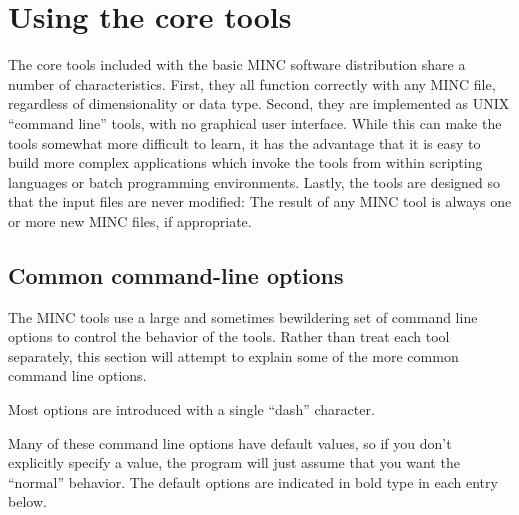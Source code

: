 \documentclass{article}
\begin{document}
\section{Using the core tools}
The core tools included with the basic MINC software distribution
share a number of characteristics.  First, they all function correctly
with any MINC file, regardless of dimensionality or data type.
Second, they are implemented as UNIX ``command line'' tools, with no
graphical user interface.  While this can make the tools somewhat more
difficult to learn, it has the advantage that it is easy to build more
complex applications which invoke the tools from within scripting
languages or batch programming environments.  Lastly, the tools are
designed so that the input files are never modified: The result of any
MINC tool is always one or more new MINC files, if appropriate.

\subsection{Common command-line options}
The MINC tools use a large and sometimes bewildering set of command line
options to control the behavior of the tools.  Rather than treat
each tool separately, this section will attempt to explain some of the 
more common command line options.

Most options are introduced with a single ``dash'' character.

Many of these command line options have default values, so if you 
don't explicitly specify a value, the program will just assume that
you want the ``normal'' behavior.  The default options are indicated
in bold type in each entry below.
\end{document}
